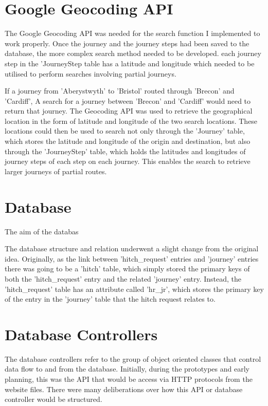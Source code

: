 \section{Google Geocoding API}
	The Google Geocoding API\cite{google_geocoding_api} was needed for the search function I implemented to work properly. Once the journey and the journey steps had been saved to the database, the more complex search method needed to be developed. each journey step in the 'Journey\textunderscore Step table has a latitude and longitude which needed to be utilised to perform searches involving partial journeys. 
	
	If a journey from 'Aberystwyth' to 'Bristol' routed through 'Brecon' and 'Cardiff', A search for a journey between 'Brecon' and 'Cardiff' would need to return that journey. The Geocoding API was used to retrieve the geographical location in the form of latitude and longitude of the two search locations. These locations could then be used to search not only through the 'Journey' table, which stores the latitude and longitude of the origin and destination, but also through the 'Journey\textunderscore Step' table, which holds the latitudes and longitudes of journey steps of each step on each journey. This enables the search to retrieve larger journeys of partial routes.
	
\section{Database}	

The aim of the databas

The database structure and relation underwent a slight change from the original idea. Originally, as the link between 'hitch_request' entries and 'journey' entries there was going to be a 'hitch' table, which simply stored the primary keys of both the 'hitch_request' entry and the related 'journey' entry. Instead, the 'hitch_request' table has an attribute called 'hr_jr', which stores the primary key of the entry in the 'journey' table that the hitch request relates to.
	
\section{Database Controllers}
	The database controllers refer to the group of object oriented classes that control data flow to and from the database. Initially, during the prototypes and early planning, this was the API that would be access via HTTP protocols from the website files. There were many deliberations over how this API or database controller would be structured.
	

